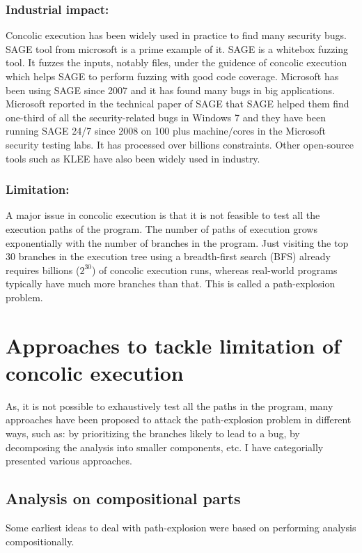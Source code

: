 \documentclass[	runningheads,
				a4paper]{llncs}
\begin{document}
\subsubsection{Industrial impact:}
Concolic execution has been widely used in practice to find many security bugs. SAGE \cite{godefroid2012sage} tool from microsoft is a prime example of it. SAGE is a whitebox fuzzing tool. It fuzzes the inputs, notably files,
under the guidence of concolic execution which helps SAGE to perform fuzzing with good code coverage. Microsoft has been using SAGE since 2007 and it has found many bugs in big applications. Microsoft reported in the technical paper of SAGE \cite{godefroid2012sage} that SAGE helped them find one-third of all the security-related bugs in Windows 7 and they have been running SAGE 24/7 since 2008 on 100 plus machine/cores in the Microsoft security testing labs. It has processed over billions constraints. Other open-source tools such as KLEE \cite{cadar2008klee} have also been widely used in industry.

\subsubsection{Limitation:}
A major issue in concolic execution is that it is not feasible to test all the execution paths of the program. The number of paths of execution grows exponentially with the number of branches in the program. Just visiting the top 30 branches in the execution tree using a breadth-first search (BFS) already requires billions (\(2^{30}\)) of concolic execution runs, whereas real-world programs typically have much more branches than that. This is called a path-explosion problem.



\section{Approaches to tackle limitation of concolic execution}
As, it is not possible to exhaustively test all the paths in the program, many approaches have been proposed to attack the path-explosion problem in different ways, such as: by prioritizing the branches likely to lead to a bug, by decomposing the analysis into smaller components, etc. I have categorially presented various approaches.


\subsection{Analysis on compositional parts}
Some earliest ideas to deal with path-explosion were based on performing analysis compositionally.
\end{document}
